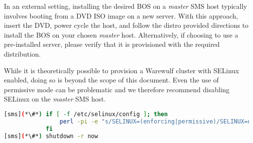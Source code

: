 In an external setting, installing the desired BOS on a {\em master} SMS host
typically involves booting from a DVD ISO image on a new server. With this
approach, insert the \baseOS{} DVD, power cycle the host, and follow the distro
provided directions to install the BOS on your chosen {\em master} host.
Alternatively, if choosing to use a pre-installed server, please verify that it
is provisioned with the required \baseOS{} distribution.

\begin{center}
\begin{tcolorbox}[]
\small
While it is theoretically possible to provision a Warewulf cluster with SELinux
enabled, doing so is beyond the scope of this document. Even the use of
permissive mode can be problematic and we therefore recommend disabling SELinux on the {\em
master} SMS host.

\begin{lstlisting}[language=bash,keywords={}]
[sms](*\#*) if [ -f /etc/selinux/config ]; then
                perl -pi -e "s/SELINUX=(enforcing|permissive)/SELINUX=disabled/" /etc/selinux/config
            fi
[sms](*\#*) shutdown -r now
\end{lstlisting}

\end{tcolorbox}
\end{center}
